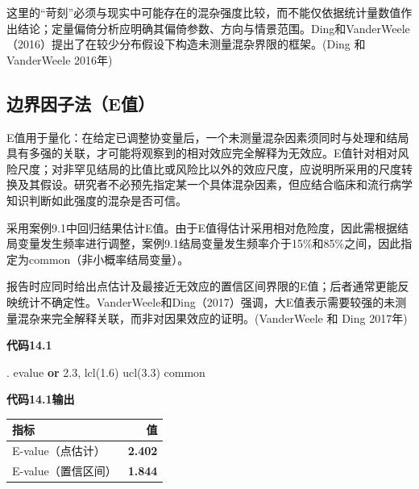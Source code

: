 \documentclass[
  chinese-hans,
  letterpaper,
  DIV=11,
  numbers=noendperiod]{scrreprt}
\newenvironment{Shaded}{\begin{snugshade}}{\end{snugshade}}
\newcommand{\KeywordTok}[1]{\textcolor[rgb]{0.00,0.23,0.31}{\textbf{#1}}}
\newcommand{\NormalTok}[1]{\textcolor[rgb]{0.00,0.23,0.31}{#1}}
\newcounter{none} %
\begin{document}
这里的``苛刻''必须与现实中可能存在的混杂强度比较，而不能仅依据统计量数值作出结论；定量偏倚分析应明确其偏倚参数、方向与情景范围。Ding和VanderWeele（2016）提出了在较少分布假设下构造未测量混杂界限的框架。(Ding
和 VanderWeele 2016年)

\subsection{边界因子法（E值）}\label{ux8fb9ux754cux56e0ux5b50ux6cd5eux503c}

E值用于量化：在给定已调整协变量后，一个未测量混杂因素须同时与处理和结局具有多强的关联，才可能将观察到的相对效应完全解释为无效应。E值针对相对风险尺度；对非罕见结局的比值比或风险比以外的效应尺度，应说明所采用的尺度转换及其假设。研究者不必预先指定某一个具体混杂因素，但应结合临床和流行病学知识判断如此强度的混杂是否可信。

采用案例9.1中回归结果估计E值。由于E值得估计采用相对危险度，因此需根据结局变量发生频率进行调整，案例9.1结局变量发生频率介于15\%和85\%之间，因此指定为common（非小概率结局变量）。

报告时应同时给出点估计及最接近无效应的置信区间界限的E值；后者通常更能反映统计不确定性。VanderWeele和Ding（2017）强调，大E值表示需要较强的未测量混杂来完全解释关联，而非对因果效应的证明。(VanderWeele
和 Ding 2017年)

\begin{tcolorbox}[enhanced jigsaw, arc=.35mm, bottomrule=.15mm, breakable, colback=white, colframe=quarto-callout-note-color-frame, left=2mm, leftrule=.75mm, opacityback=0, rightrule=.15mm, toprule=.15mm]

\vspace{-3mm}\textbf{代码14.1}\vspace{3mm}

\begin{Shaded}
\begin{Highlighting}[]
\NormalTok{. evalue }\KeywordTok{or}\NormalTok{ 2.3, lcl(1.6) ucl(3.3) common}
\end{Highlighting}
\end{Shaded}

\end{tcolorbox}

\begin{tcolorbox}[enhanced jigsaw, arc=.35mm, bottomrule=.15mm, breakable, colback=white, colframe=quarto-callout-note-color-frame, left=2mm, leftrule=.75mm, opacityback=0, rightrule=.15mm, toprule=.15mm]

\vspace{-3mm}\textbf{代码14.1输出}\vspace{3mm}

{\def\LTcaptype{none} %
\begin{longtable}[]{@{}lr@{}}
\toprule\noalign{}
指标 & 值 \\
\midrule\noalign{}
\endhead
\bottomrule\noalign{}
\endlastfoot
E-value（点估计） & \textbf{2.402} \\
E-value（置信区间） & \textbf{1.844} \\
\end{longtable}
}

\end{tcolorbox}
\end{document}
